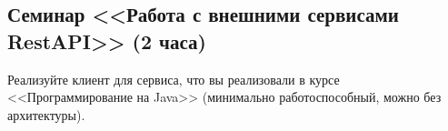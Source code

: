 \subsection{Семинар <<Работа с внешними сервисами RestAPI>> (2 часа)}


Реализуйте клиент для сервиса, что вы реализовали в курсе <<Программирование на Java>> (минимально работоспособный, можно без архитектуры).


